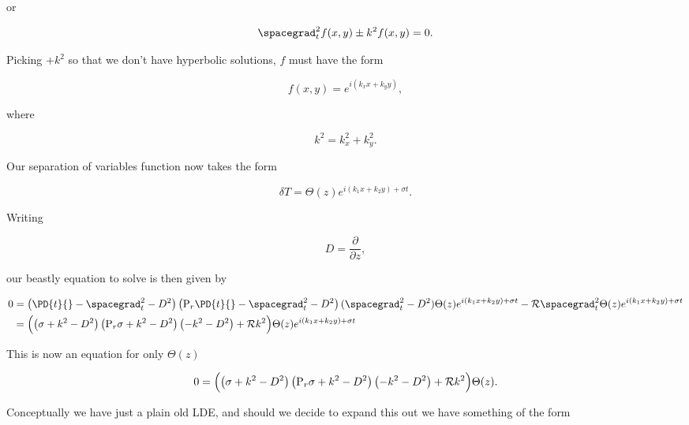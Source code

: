 or

\begin{equation}\label{eqn:continuumL22:790}
\spacegrad_t^2 f(x, y) \pm k^2 f(x, y) = 0.
\end{equation}

Picking $+ k^2$ so that we don't have hyperbolic solutions, $f$ must have the form

\begin{equation}\label{eqn:continuumL22:810}
f(x, y) = e^{i (k_x x + k_y y)},
\end{equation}

where 

\begin{equation}\label{eqn:continuumL22:830}
k^2 = k_x^2 + k_y^2.
\end{equation}

Our separation of variables function now takes the form

\begin{equation}\label{eqn:continuumL22:850}
\delta T = \Theta(z) e^{ i ( k_1 x + k_2 y) + \sigma t}.
\end{equation}

Writing

\begin{equation}\label{eqn:continuumL22:570}
D = \frac{\partial}{\partial z},
\end{equation}

our beastly equation to solve is then given by

\begin{align*}
0 
&= 
\left( \PD{t}{} - \spacegrad_t^2 - D^2 \right) \left( \text{P}_r \PD{t}{} - \spacegrad_t^2 -D^2 \right) (\spacegrad_t^2 -D^2)
\Theta(z) e^{ i ( k_1 x + k_2 y) + \sigma t}
- \mathcal{R} \spacegrad_t^2 
\Theta(z) e^{ i ( k_1 x + k_2 y) + \sigma t}
\\
&=
\Bigl( \left( \sigma + k^2 - D^2 \right) \left( \text{P}_r \sigma + k^2 - D^2 \right) \left( -k^2 -D^2 \right) + \mathcal{R} k^2 
\Bigr) \Theta(z) e^{ i ( k_1 x + k_2 y) + \sigma t}
\end{align*}

This is now an equation for only $\Theta(z)$ 

\begin{equation}\label{eqn:continuumL22:870}
0 = \Bigl( \left( \sigma + k^2 - D^2 \right) \left( \text{P}_r \sigma + k^2 - D^2 \right) \left( -k^2 -D^2 \right) + \mathcal{R} k^2 
\Bigr) \Theta(z).
\end{equation}

Conceptually we have just a plain old LDE, and should we decide to expand this out we have something of the form

